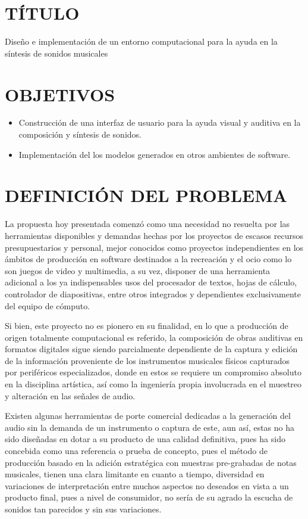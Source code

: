 \documentclass{book}
\begin{document}
	\thispagestyle{empty}
	\frontmatter
	
	\section*{TÍTULO}
	\Large{Diseño e implementación de un entorno computacional para la ayuda en la síntesis de sonidos musicales}
	\section*{OBJETIVOS}
	\begin{itemize}
		\item Construcción de una interfaz de usuario para la ayuda visual y auditiva en la composición y síntesis de sonidos.
		\item Implementación del los modelos generados en otros ambientes de software.
	\end{itemize}
	\section*{DEFINICIÓN DEL PROBLEMA}
	La propuesta hoy presentada comenzó como una necesidad no resuelta por las herramientas disponibles y demandas hechas por los proyectos de escasos recursos presupuestarios y personal, mejor conocidos como proyectos independientes en los ámbitos de producción en software destinados a la recreación y el ocio como lo son juegos de video y multimedia, a su vez, disponer de una herramienta adicional a los ya indispensables usos del procesador de textos, hojas de cálculo, controlador de diapositivas, entre otros integrados y dependientes exclusivamente del equipo de cómputo. \par
	
	Si bien, este proyecto no es pionero en su finalidad, en lo que a producción de origen totalmente computacional es referido, la composición de obras auditivas en formatos digitales sigue siendo parcialmente dependiente de la captura y edición de la información proveniente de los instrumentos musicales físicos capturados por periféricos especializados, donde en estos se requiere un compromiso absoluto en la disciplina artística, así como la ingeniería propia involucrada en el muestreo y alteración en las señales de audio.\pagebreak\par
	
	Existen algunas herramientas de porte comercial dedicadas a la generación del audio sin la demanda de un instrumento o captura de este, aun así, estas no ha sido diseñadas en dotar a su producto de una calidad definitiva, pues ha sido concebida como una referencia o prueba de concepto, pues el método de producción basado en la adición estratégica con muestras pre-grabadas de notas musicales, tienen una clara limitante en cuanto a tiempo, diversidad en variaciones de interpretación entre muchos aspectos no deseados en vista a un producto final, pues a nivel de consumidor, no sería de su agrado la escucha de sonidos tan parecidos y sin sus variaciones.\par
	
\end{document}
